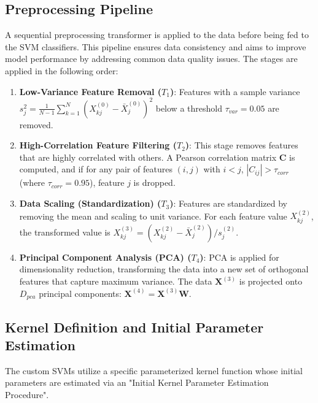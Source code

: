\documentclass[conference]{IEEEtran} %
\newcommand{\mat}[1]{\mathbf{#1}} %
\begin{document}
\subsection{Preprocessing Pipeline}
A sequential preprocessing transformer is applied to the data before being fed to the SVM classifiers. This pipeline ensures data consistency and aims to improve model performance by addressing common data quality issues. The stages are applied in the following order:
\begin{enumerate}
    \item \textbf{Low-Variance Feature Removal ($T_1$)}: Features with a sample variance $s_j^2 = \frac{1}{N-1}\sum_{k=1}^{N} (X_{kj}^{(0)} - \bar{X}_j^{(0)})^2$ below a threshold $\tau_{var} = 0.05$ are removed.
    \item \textbf{High-Correlation Feature Filtering ($T_2$)}: This stage removes features that are highly correlated with others. A Pearson correlation matrix $\mat{C}$ is computed, and if for any pair of features $(i, j)$ with $i < j$, $|C_{ij}| > \tau_{corr}$ (where $\tau_{corr} = 0.95$), feature $j$ is dropped.
    \item \textbf{Data Scaling (Standardization) ($T_3$)}: Features are standardized by removing the mean and scaling to unit variance. For each feature value $X_{kj}^{(2)}$, the transformed value is $X_{kj}^{(3)} = (X_{kj}^{(2)} - \bar{X}_j^{(2)}) / s_j^{(2)}$.
    \item \textbf{Principal Component Analysis (PCA) ($T_4$)}: PCA is applied for dimensionality reduction, transforming the data into a new set of orthogonal features that capture maximum variance. The data $\mat{X}^{(3)}$ is projected onto $D_{pca}$ principal components: $\mat{X}^{(4)} = \mat{X}^{(3)} \mat{W}$.
\end{enumerate}

\subsection{Kernel Definition and Initial Parameter Estimation}
The custom SVMs utilize a specific parameterized kernel function whose initial parameters are estimated via an "Initial Kernel Parameter Estimation Procedure".
\end{document}

